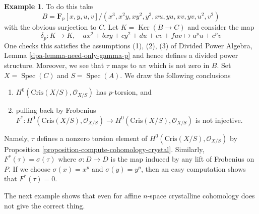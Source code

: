 \documentclass{stacks-project}
\theoremstyle{plain}
\theoremstyle{definition}
\newtheorem{example}[subsection]{Example}
\theoremstyle{remark}
\numberwithin{equation}{subsection}
\def\Spec{\mathop{\mathrm{Spec}}}
\def\Ker{\mathop{\mathrm{Ker}}}
\begin{document}
\begin{example}
To do this take
$$
B = \mathbf{F}_p[x, y, u, v]/(x^3, x^2y, xy^2, y^3, xu, yu, xv, yv, u^2, v^2)
$$
with the obvious surjection to $C$. Let $K = \Ker(B \to C)$ and
consider the map
$$
\delta_p : K \longrightarrow K,\quad
ax^2 + bxy + cy^2 + du + ev + fuv \longmapsto a^pu + c^pv
$$
One checks this satisfies the assumptions (1), (2), (3) of
Divided Power Algebra, Lemma \ref{dpa-lemma-need-only-gamma-p}
and hence defines a divided power structure. Moreover,
we see that $\tau$ maps to $uv$ which is not zero in $B$.
Set $X = \Spec(C)$ and $S = \Spec(A)$.
We draw the following conclusions
\begin{enumerate}
\item $H^0(\text{Cris}(X/S), \mathcal{O}_{X/S})$ has $p$-torsion, and
\item pulling back by Frobenius $F^* : H^0(\text{Cris}(X/S), \mathcal{O}_{X/S})
\to H^0(\text{Cris}(X/S), \mathcal{O}_{X/S})$ is not injective.
\end{enumerate}
Namely, $\tau$ defines a nonzero torsion element of
$H^0(\text{Cris}(X/S), \mathcal{O}_{X/S})$ by
Proposition \ref{proposition-compute-cohomology-crystal}.
Similarly, $F^*(\tau) = \sigma(\tau)$ where $\sigma : D \to D$ is the
map induced by any lift of Frobenius on $P$. If we choose $\sigma(x) = x^p$
and $\sigma(y) = y^p$, then an easy computation shows that $F^*(\tau) = 0$.
\end{example}

\noindent
The next example shows that even for affine $n$-space crystalline
cohomology does not give the correct thing.
\end{document}
